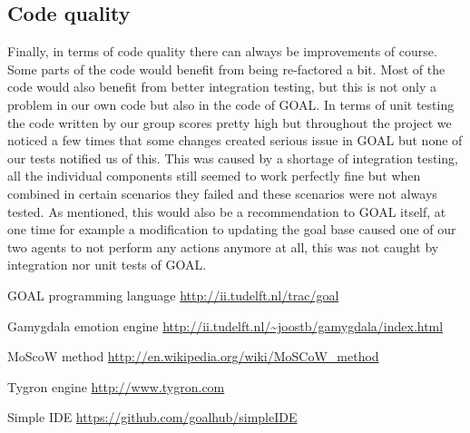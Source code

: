 \documentclass[]{article}
\begin{document}
\subsection{Code quality}
Finally, in terms of code quality there can always be improvements of course. Some parts of the code would benefit from being re-factored a bit. Most of the code would also benefit from better integration testing, but this is not only a problem in our own code but also in the code of GOAL. In terms of unit testing the code written by our group scores pretty high but throughout the project we noticed a few times that some changes created serious issue in GOAL but none of our tests notified us of this. This was caused by a shortage of integration testing, all the individual components still seemed to work perfectly fine but when combined in certain scenarios they failed and these scenarios were not always tested. As mentioned, this would also be a recommendation to GOAL itself, at one time for example a modification to updating the goal base caused one of our two agents to not perform any actions anymore at all, this was not caught by integration nor unit tests of GOAL.

\clearpage
\printglossaries


\begin{thebibliography}{9}
	
	GOAL programming language
	\url{http://ii.tudelft.nl/trac/goal}
	
	Gamygdala emotion engine
	\url{http://ii.tudelft.nl/~joostb/gamygdala/index.html}
	
	MoScoW method
	\url{http://en.wikipedia.org/wiki/MoSCoW_method }
	
	Tygron engine
	\url{http://www.tygron.com }
	
	Simple IDE
	\url{https://github.com/goalhub/simpleIDE }
	
	
\end{thebibliography}
\end{document}
